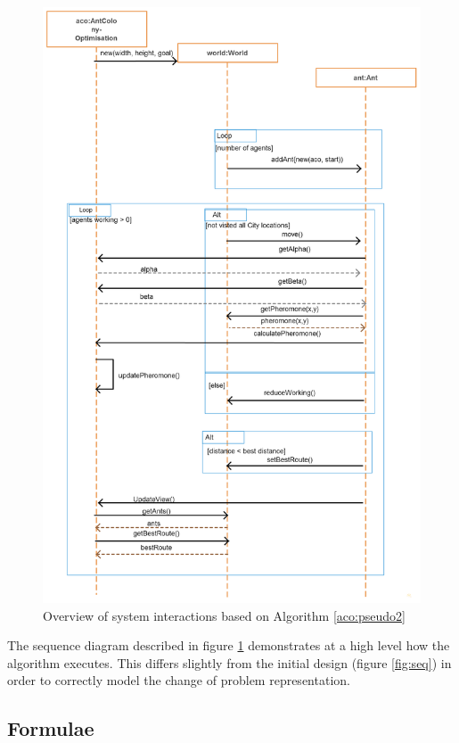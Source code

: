 \begin{figure}[H]
\includegraphics[scale=0.27]{Images/chapter4/sequence}
\caption[Overall Sequence Diagram]{Overview of system interactions based on Algorithm \ref{aco:pseudo2}}
\label{fig:overSeq}
\end{figure}

The sequence diagram described in figure \ref{fig:overSeq} demonstrates at a high level how the algorithm executes. This differs slightly from the initial design (figure \ref{fig:seq}) in order to correctly model the change of problem representation.

\subsection{Formulae}

